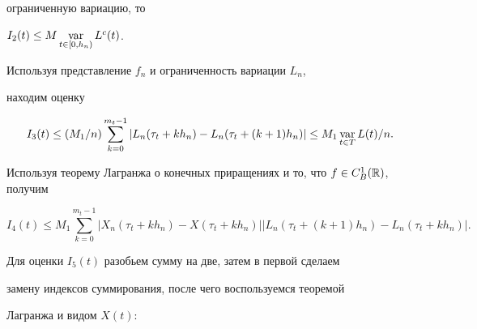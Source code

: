 ограниченную вариацию, то


$I_2(t)\leq M \var\limits_{t\in [0,h_n)}L^c(t)$.


Используя представление $f_n$ и ограниченность вариации $L_n$,


находим оценку


$$


I_3(t)\leq (M_1/n)


\sum_{k=0}^{m_t-1}|L_n(\tau_t+kh_n)-L_n(\tau_t+(k+1)h_n)|\leq


M_1\var_{t\in T}L(t)/n.


$$


Используя теорему Лагранжа о конечных приращениях и то, что $f\in


C_B^1(\Bbb{R})$, получим


$$


I_4(t) \leq M_1  \sum_{k=0}^{m_t-1}|X_n(\tau_t+kh_n)-


X(\tau_t+kh_n)||L_n(\tau_t+(k+1)h_n)- L_n(\tau_t+kh_n)|.


$$


Для оценки $I_5(t)$ разобьем сумму на две, затем в первой сделаем


замену индексов суммирования, после чего воспользуемся теоремой


Лагранжа и видом $X(t)$:


